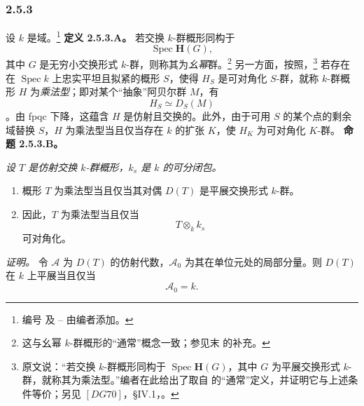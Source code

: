 
\subsubsection*{2.5.3}
\label{sga3:VIIB:2.5.3}
设 \(k\) 是域。\footnote{\label{sga3:VIIB:nde:103}编号  及 -- 由编者添加。}
\medskip
\noindent\textbf{定义 2.5.3.A。}
\label{sga3:VIIB:2.5.3.A}
若交换 \(k\)-群概形同构于
\[
  \operatorname{Spec}\mathbf H(G),
\]
其中 \(G\) 是无穷小交换形式 \(k\)-群，则称其为\emph{幺幂}群。\footnote{%
\label{sga3:VIIB:nde:104}这与幺幂 \(k\)-群概形的“通常”概念一致；参见末  的补充。}
另一方面，按照，\footnote{\label{sga3:VIIB:nde:105}原文说：“若交换 \(k\)-群概形同构于 \(\operatorname{Spec}\mathbf H(G)\)，其中 \(G\) 为平展交换形式 \(k\)-群，就称其为乘法型。”编者在此给出了取自 的“通常”定义，并证明它与上述条件等价；另见 \([DG70]\)，§IV.1，。}
若存在在 \(\operatorname{Spec}k\) 上忠实平坦且拟紧的概形 \(S\)，使得 \(H_S\) 是可对角化 \(S\)-群，就称 \(k\)-群概形 \(H\) 为\emph{乘法型}；即对某个“抽象”阿贝尔群 \(M\)，有
\[
  H_S\simeq D_S(M)
\]
。由 fpqc 下降，这蕴含 \(H\) 是仿射且交换的。此外，由于可用 \(S\) 的某个点的剩余域替换 \(S\)，\(H\) 为乘法型当且仅当存在 \(k\) 的扩张 \(K\)，使 \(H_K\) 为可对角化 \(K\)-群。
\medskip
\noindent\textbf{命题 2.5.3.B。}
\label{sga3:VIIB:2.5.3.B}
{\itshape 设 \(T\) 是仿射交换 \(k\)-群概形，\(k_s\) 是 \(k\) 的可分闭包。
\begin{enumerate}
\item[\textup{(i)}] 概形 \(T\) 为乘法型当且仅当其对偶 \(D(T)\) 是平展交换形式 \(k\)-群。
\item[\textup{(ii)}] 因此，\(T\) 为乘法型当且仅当
\[
  T\otimes_k k_s
\]
可对角化。
\end{enumerate}}
\textit{证明。}
令 \(\mathcal A\) 为 \(D(T)\) 的仿射代数，\(\mathcal A_0\) 为其在单位元处的局部分量。则 \(D(T)\) 在 \(k\) 上平展当且仅当
\[
  \mathcal A_0=k.
\]

